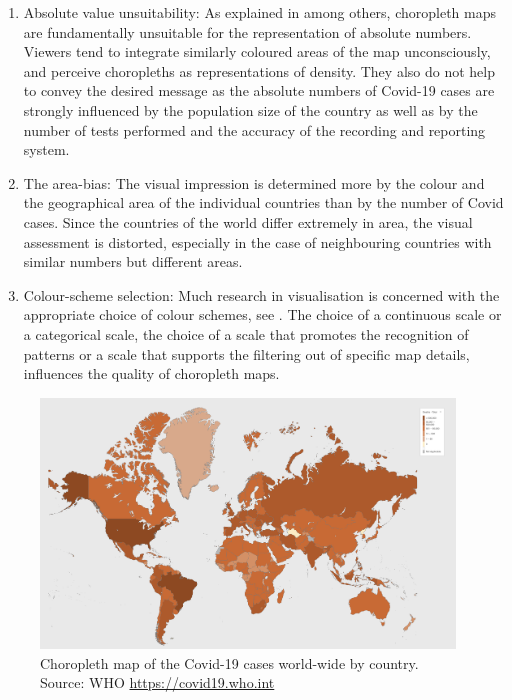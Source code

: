 \documentclass[article]{jdssv}\usepackage[]{graphicx}\usepackage[]{xcolor}
\begin{document}
\begin{enumerate}
\item Absolute value unsuitability: As explained in \citep{monmonier2005, slocum2008, speckmann2010} among others, choropleth maps are fundamentally unsuitable for the representation of absolute numbers. Viewers tend to integrate similarly coloured areas of the map unconsciously, and perceive choropleths as representations of density. They also do not help to convey the desired message as the absolute numbers of Covid-19 cases are strongly influenced by the population size of the country as well as by the number of tests performed and the accuracy of the recording and reporting system. 
\item The area-bias: The visual impression is determined more by the colour and the geographical area of the individual countries than by the number of Covid cases. Since the countries of the world differ extremely in area, the visual assessment is distorted, especially in the case of neighbouring countries with similar numbers but different areas.
\item Colour-scheme selection: Much research in visualisation is concerned with the appropriate choice of colour schemes, see \citep{brewer1997, color2021}. The choice of a continuous scale or a categorical scale, the choice of a scale that promotes the recognition of patterns or a scale that supports the filtering out of specific map details, influences the quality of choropleth maps.
\end{enumerate}

\begin{figure}
	\includegraphics[width = 0.98\textwidth]{Figures_Web/who_totalcases_choro.png}
	\caption{Choropleth map of the Covid-19 cases world-wide by country. Source: WHO \url{https://covid19.who.int}}
	\label{fig:choro1}
\end{figure}
\end{document}
